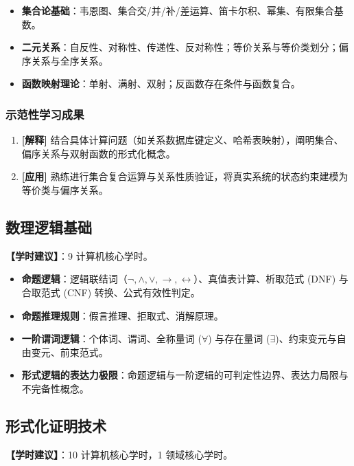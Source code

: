 \begin{itemize}
    \item \textbf{集合论基础}：韦恩图、集合交/并/补/差运算、笛卡尔积、幂集、有限集合基数。
    \item \textbf{二元关系}：自反性、对称性、传递性、反对称性；等价关系与等价类划分；偏序关系与全序关系。
    \item \textbf{函数映射理论}：单射、满射、双射；反函数存在条件与函数复合。
\end{itemize}

\subsubsection{示范性学习成果}
\begin{enumerate}
    \item \textbf{[解释]} 结合具体计算问题（如关系数据库键定义、哈希表映射），阐明集合、偏序关系与双射函数的形式化概念。
    \item \textbf{[应用]} 熟练进行集合复合运算与关系性质验证，将真实系统的状态约束建模为等价类与偏序关系。
\end{enumerate}

\subsection{数理逻辑基础}
\textbf{【学时建议】}：9 计算机核心学时。

\begin{itemize}
    \item \textbf{命题逻辑}：逻辑联结词（$\neg, \land, \lor, \to, \leftrightarrow$）、真值表计算、析取范式 (DNF) 与合取范式 (CNF) 转换、公式有效性判定。
    \item \textbf{命题推理规则}：假言推理、拒取式、消解原理。
    \item \textbf{一阶谓词逻辑}：个体词、谓词、全称量词 ($\forall$) 与存在量词 ($\exists$)、约束变元与自由变元、前束范式。
    \item \textbf{形式逻辑的表达力极限}：命题逻辑与一阶逻辑的可判定性边界、表达力局限与不完备性概念。
\end{itemize}

\subsection{形式化证明技术}
\textbf{【学时建议】}：10 计算机核心学时，1 领域核心学时。


